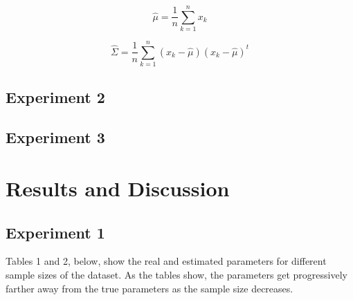 \documentclass{article}
\begin{document}
\begin{equation}
\widehat{\mu} = \frac{1}{n}\sum_{k=1}^{n}x_{k}
\label{eq:1.6}
\end{equation}

\begin{equation}
\widehat{\Sigma} = \frac{1}{n}\sum_{k=1}^{n}(x_{k} - \widehat{\mu})(x_{k} - \widehat{\mu})^{t}
\label{eq:1.7}
\end{equation}

\subsection{Experiment 2}\label{experiment-2}

\subsection{Experiment 3}\label{experiment-3}

\newpage
\section{Results and Discussion}\label{results-and-discussion}

\subsection{Experiment 1}\label{experiment-1-1}

Tables 1 and 2, below, show the real and estimated parameters for different sample sizes of the dataset. As the tables show, the parameters get progressively farther away from the true parameters as the sample size decreases. 
\end{document}
